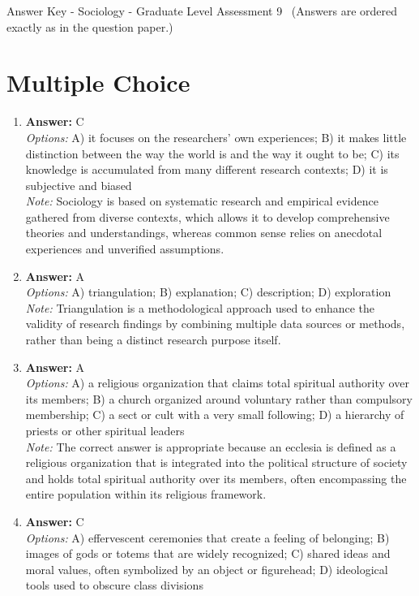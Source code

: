 \documentclass[12pt]{article}
\begin{document}
\begin{center}
Answer Key - Sociology - Graduate Level Assessment 9 \
\small (Answers are ordered exactly as in the question paper.)
\end{center}

\section*{Multiple Choice}
\begin{enumerate}[label=\arabic*.]
\item \textbf{Answer:} C
\\ \textit{Options:} A) it focuses on the researchers' own experiences; B) it makes little distinction between the way the world is and the way it ought to be; C) its knowledge is accumulated from many different research contexts; D) it is subjective and biased
\\ \textit{Note:} Sociology is based on systematic research and empirical evidence gathered from diverse contexts, which allows it to develop comprehensive theories and understandings, whereas common sense relies on anecdotal experiences and unverified assumptions.
\item \textbf{Answer:} A
\\ \textit{Options:} A) triangulation; B) explanation; C) description; D) exploration
\\ \textit{Note:} Triangulation is a methodological approach used to enhance the validity of research findings by combining multiple data sources or methods, rather than being a distinct research purpose itself.
\item \textbf{Answer:} A
\\ \textit{Options:} A) a religious organization that claims total spiritual authority over its members; B) a church organized around voluntary rather than compulsory membership; C) a sect or cult with a very small following; D) a hierarchy of priests or other spiritual leaders
\\ \textit{Note:} The correct answer is appropriate because an ecclesia is defined as a religious organization that is integrated into the political structure of society and holds total spiritual authority over its members, often encompassing the entire population within its religious framework.
\item \textbf{Answer:} C
\\ \textit{Options:} A) effervescent ceremonies that create a feeling of belonging; B) images of gods or totems that are widely recognized; C) shared ideas and moral values, often symbolized by an object or figurehead; D) ideological tools used to obscure class divisions

\end{enumerate}
\end{document}
